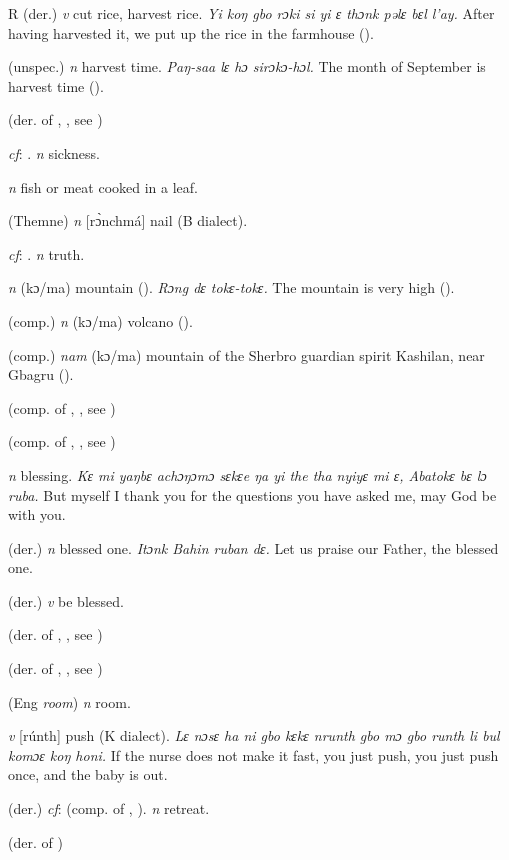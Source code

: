\begin{letter}{R}
 (der.) \textit{v} cut rice, harvest rice. \textit{Yi koŋ gbo rɔki si yi ɛ thɔnk pəlɛ bɛl l'ay.} After having harvested it, we put up the rice in the farmhouse (\citealt{Pichl1967}). 

 (unspec.) \textit{n} harvest time. \textit{Paŋ-saa lɛ hɔ sirɔkɔ-hɔl.} The month of September is harvest time (\citealt{Pichl1967}). 

 (der. of , , see ) 

 \textit{cf}: . \textit{n} sickness.

 \textit{n} fish or meat cooked in a leaf.

 (Themne) \textit{n} [rɔ̀nchmá] nail (B dialect). 

 \textit{cf}: . \textit{n} truth.

 \textit{n} (kɔ/ma) mountain (\citealt{Pichl1967}). \textit{Rɔng dɛ tokɛ-tokɛ.} The mountain is very high (\citealt{Pichl1967}).

 (comp.) \textit{n} (kɔ/ma) volcano (\citealt{Pichl1967}).

 (comp.) \textit{nam} (kɔ/ma) mountain of the Sherbro guardian spirit Kashilan, near Gbagru (\citealt{Pichl1967}). 

 (comp. of , , see ) 

 (comp. of , , see ) 

 \textit{n} blessing. \textit{Kɛ mi yaŋbɛ achɔŋɔmɔ sɛkɛe ŋa yi the tha nyiyɛ mi ɛ, Abatokɛ bɛ lɔ ruba.} But myself I thank you for the questions you have asked me, may God be with you.

 (der.) \textit{n} blessed one. \textit{Itɔnk Bahin ruban dɛ.} Let us praise our Father, the blessed one.

 (der.) \textit{v} be blessed.

 (der. of , , see ) 

 (der. of , , see ) 

 (Eng \textit{room}) \textit{n} room.

 \textit{v} [rúnth] push (K dialect). \textit{Lɛ nɔsɛ ha ni gbo kɛkɛ nrunth gbo mɔ gbo runth li bul komɔɛ koŋ honi.} If the nurse does not make it fast, you just push, you just push once, and the baby is out.

 (der.) \textit{cf}:  (comp. of , ). \textit{n} retreat.

 (der. of ) 

\end{letter}
